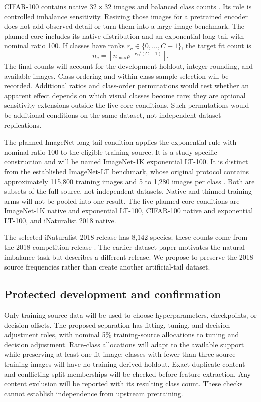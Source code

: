 \documentclass[conference]{IEEEtran}
\begin{document}
CIFAR-100 contains native $32\times32$ images and balanced class counts \cite{krizhevsky2009cifar}. Its role is controlled imbalance sensitivity. Resizing those images for a pretrained encoder does not add observed detail or turn them into a large-image benchmark. The planned core includes its native distribution and an exponential long tail with nominal ratio 100. If classes have ranks $r_c\in\{0,\ldots,C-1\}$, the target fit count is
\begin{equation}
n_c=\left\lfloor n_{\max}\rho^{-r_c/(C-1)}\right\rfloor.
\label{eq:tail}
\end{equation}
The final counts will account for the development holdout, integer rounding, and available images. Class ordering and within-class sample selection will be recorded. Additional ratios and class-order permutations would test whether an apparent effect depends on which visual classes become rare; they are optional sensitivity extensions outside the five core conditions. Such permutations would be additional conditions on the same dataset, not independent dataset replications.

The planned ImageNet long-tail condition applies the exponential rule with nominal ratio 100 to the eligible training source. It is a study-specific construction and will be named ImageNet-1K exponential LT-100. It is distinct from the established ImageNet-LT benchmark, whose original protocol contains approximately 115,800 training images and 5 to 1,280 images per class \cite{liu2019oltr}. Both are subsets of the full source, not independent datasets. Native and thinned training arms will not be pooled into one result. The five planned core conditions are ImageNet-1K native and exponential LT-100, CIFAR-100 native and exponential LT-100, and iNaturalist 2018 native.

The selected iNaturalist 2018 release has 8,142 species; these counts come from the 2018 competition release \cite{inat2018release}. The earlier dataset paper \cite{vanhorn2018inat} motivates the natural-imbalance task but describes a different release. We propose to preserve the 2018 source frequencies rather than create another artificial-tail dataset.

\subsection{Protected development and confirmation}
Only training-source data will be used to choose hyperparameters, checkpoints, or decision offsets. The proposed separation has fitting, tuning, and decision-adjustment roles, with nominal 5\% training-source allocations to tuning and decision adjustment. Rare-class allocations will adapt to the available support while preserving at least one fit image; classes with fewer than three source training images will have no training-derived holdout. Exact duplicate content and conflicting split memberships will be checked before feature extraction. Any content exclusion will be reported with its resulting class count. These checks cannot establish independence from upstream pretraining.
\end{document}
